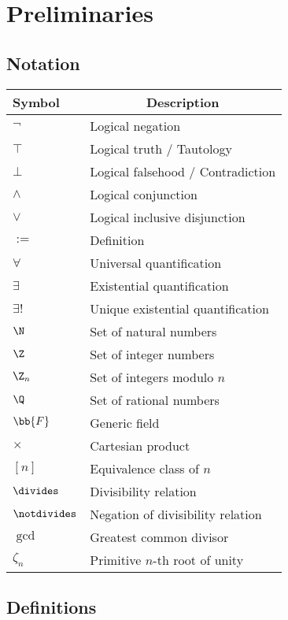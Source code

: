 \chapter{Preliminaries}

\section{Notation}

\begin{tabular}{>{\centering}m{1.8cm} m{5.8cm}}
\toprule
\textbf{Symbol} & \multicolumn{1}{c}{\textbf{Description}} \\
\midrule
$\lnot$ & Logical negation \\
$\top$  & Logical truth / Tautology \\
$\bot$  & Logical falsehood / Contradiction \\
$\land$ & Logical conjunction \\
$\lor$ & Logical inclusive disjunction \\
$:=$   & Definition \\
$\forall$ & Universal quantification \\
$\exists$ & Existential quantification \\
$\exists!$ & Unique existential quantification \\
$\N$ & Set of natural numbers \\
$\Z$ & Set of integer numbers \\
$\Z_n$ & Set of integers modulo $n$ \\
$\Q$ & Set of rational numbers \\
$\bb{F}$ & Generic field \\
$\times$ & Cartesian product \\
$[n]$ & Equivalence class of $n$ \\
$\divides$ & Divisibility relation \\
$\notdivides$ & Negation of divisibility relation \\
$\gcd$ & Greatest common divisor \\
$\zeta_n$ & Primitive $n$-th root of unity \\
\bottomrule
\end{tabular}

\newpage

\section{Definitions}

